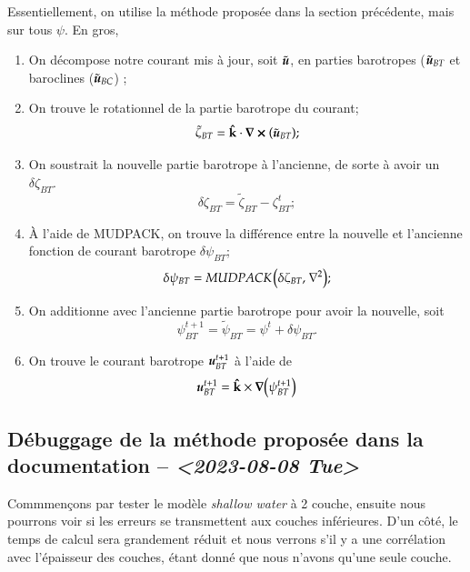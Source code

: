 \documentclass[10pt]{article}
\numberwithin{equation}{section}
\newcommand{\kvf}{\vb{\hat{k}}}
\newcommand{\uu}{\vb*{u}}
\newcommand{\pt}{\hspace{1pt}}
\begin{document}
Essentiellement, on utilise la méthode proposée dans la section précédente, mais sur tous \(\psi\).
En gros,
\begin{enumerate}
\item On décompose notre courant mis à jour, soit \(\tilde{\uu}\), en parties barotropes (\(\tilde{\uu}_{BT}\) et baroclines (\(\tilde{\uu}_{BC}\)) ;
\item On trouve le rotationnel de la partie barotrope du courant;
\begin{equation}
   \tilde{\zeta}_{BT} = \kvf\cdot\curl(\tilde{\uu}_{BT});
\end{equation}
\item On soustrait la nouvelle partie barotrope à l'ancienne, de sorte à avoir un \(\delta \zeta_{BT}\).
\begin{equation}
   \delta \zeta_{BT} = \tilde{\zeta}_{BT} - \zeta_{BT}^t;
\end{equation}
\item À l'aide de MUDPACK, on trouve la différence entre la nouvelle et l'ancienne fonction de courant barotrope \(\delta \psi_{BT}\);
\begin{equation}
   \delta \psi_{BT} = MUDPACK \pt \qty(\delta \zeta_{BT},\pt \laplacian{});
\end{equation}
\item On additionne avec l'ancienne partie barotrope pour avoir la nouvelle, soit
\begin{equation}
   \psi^{t+1}_{BT} = \tilde{\psi}_{BT} = \psi^{t} + \delta \psi_{BT}.
\end{equation}
\item On trouve le courant barotrope \(\uu^{t+1}_{BT}\) à l'aide de
\begin{equation}
   \uu^{t+1}_{BT} = \kvf\times\gradient(\psi^{t+1}_{BT})
\end{equation}
\end{enumerate}

\subsection{Débuggage de la méthode proposée dans la documentation -- \textit{<2023-08-08 Tue>}}
\label{sec:org9310810}

Commmençons par tester le modèle \emph{shallow water} à 2 couche, ensuite nous pourrons voir si les erreurs se transmettent aux couches inférieures.
D'un côté, le temps de calcul sera grandement réduit et nous verrons s'il y a une corrélation avec l'épaisseur des couches, étant donné que nous n'avons qu'une seule couche.\bigskip
\end{document}
